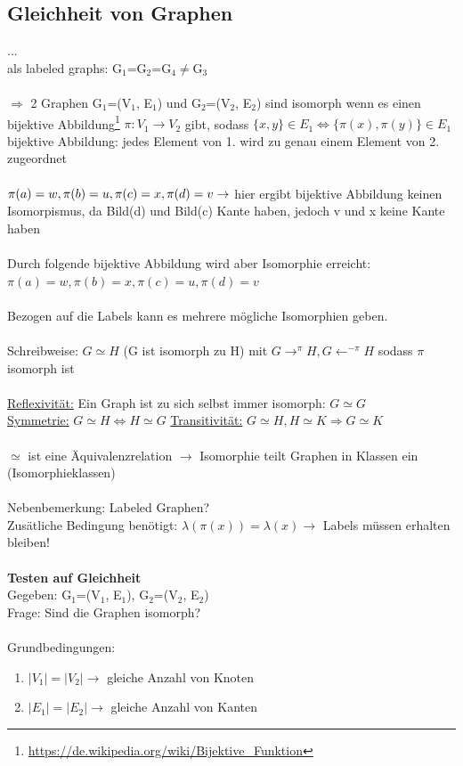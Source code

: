 \subsection{Gleichheit von Graphen}
...\\
als labeled graphs: G$_1$=G$_2$=G$_4\neq$G$_3$\\\\
$\Rightarrow$ 2 Graphen G$_1$=(V$_1$, E$_1$) und G$_2$=(V$_2$, E$_2$) sind isomorph wenn es einen bijektive Abbildung\footnote{\url{https://de.wikipedia.org/wiki/Bijektive_Funktion}} $\pi:V_1 \rightarrow V_2$ gibt, sodass $\{x,y\} \in E_1 \Leftrightarrow \{\pi(x),\pi(y)\} \in E_1$
\\
bijektive Abbildung: jedes Element von 1. wird zu genau einem Element von 2. zugeordnet\\\\
$\pi(a)=w, \pi(b)=u, \pi(c)=x, \pi(d)=v \\ \rightarrow$ hier ergibt bijektive Abbildung keinen Isomorpismus, da Bild(d) und Bild(c) Kante haben, jedoch v und x keine Kante haben\\\\
Durch folgende bijektive Abbildung wird aber Isomorphie erreicht:\\
$\pi(a)=w, \pi(b)=x, \pi(c)=u, \pi(d)=v$
\\\\
Bezogen auf die Labels kann es mehrere mögliche Isomorphien geben.
\\\\
Schreibweise: $G \simeq H$ (G ist isomorph zu H) mit 
$G\rightarrow^\pi H, G \leftarrow^{-\pi}H$ sodass $\pi$ isomorph ist
\\\\
\underline{Reflexivität:} Ein Graph ist zu sich selbst immer isomorph: $G \simeq G$\\
\underline{Symmetrie:} $G \simeq H \Leftrightarrow H \simeq G$
\underline{Transitivität:} $G \simeq H, H \simeq K \Rightarrow G \simeq K$\\
\\
$\simeq$ ist eine Äquivalenzrelation $\rightarrow$ Isomorphie teilt Graphen in Klassen ein (Isomorphieklassen)
\\\\
Nebenbemerkung: Labeled Graphen?\\
Zusätliche Bedingung benötigt: $\lambda(\pi(x))=\lambda(x) \rightarrow$ Labels müssen erhalten bleiben!
\\\\
\textbf{Testen auf Gleichheit}\\
Gegeben: G$_1$=(V$_1$, E$_1$), G$_2$=(V$_2$, E$_2$)\\
Frage: Sind die Graphen isomorph?
\\\\
Grundbedingungen:
\begin{enumerate}
	\item $|V_1| = |V_2| \rightarrow$ gleiche Anzahl von Knoten
	\item $|E_1| = |E_2| \rightarrow$ gleiche Anzahl von Kanten
\end{enumerate}

